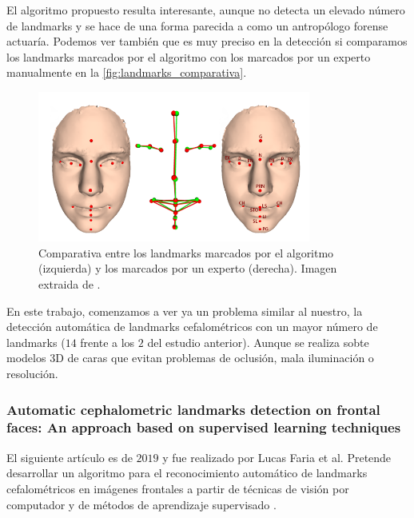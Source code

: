                \medskip

                \noindent El algoritmo propuesto resulta interesante, aunque no detecta un elevado número de landmarks y se hace de una forma parecida a como un antropólogo forense actuaría. Podemos ver también que es muy preciso en la detección si comparamos los landmarks marcados por el algoritmo con los marcados por un experto manualmente en la \autoref{fig:landmarks_comparativa}.


                \begin{figure}[!h]
                    \centering
                    \includegraphics[width=0.8\textwidth]{img/comparativa_landmarks.png}
                    \caption{Comparativa entre los landmarks marcados por el algoritmo (izquierda) y los marcados por un experto (derecha). Imagen extraida de \cite{galvanek2015automated}.}
                    \label{fig:landmarks_comparativa}
                \end{figure}

                \medskip

                \noindent En este trabajo, comenzamos a ver ya un problema similar al nuestro, la detección automática de landmarks cefalométricos con un mayor número de landmarks ($14$ frente a los $2$ del estudio anterior). Aunque se realiza sobte modelos $3$D de caras que evitan problemas de oclusión, mala iluminación o resolución.

            \subsubsection{Automatic cephalometric landmarks detection on frontal faces: An approach based on supervised learning techniques}

                \noindent El siguiente artículo es de $2019$ y fue realizado por Lucas Faria et al. Pretende desarrollar un algoritmo para el reconocimiento automático de landmarks cefalométricos en imágenes frontales a partir de técnicas de visión por computador y de métodos de aprendizaje supervisado \cite{porto2019automatic}.

